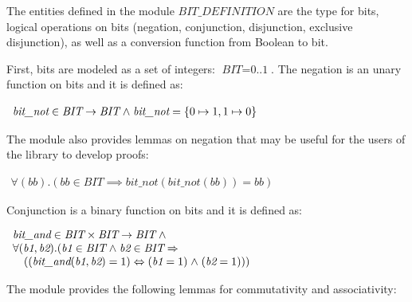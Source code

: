 \documentclass[a4paper]{llncs}
\begin{document}
The entities defined in the module $\textit{BIT\_DEFINITION}$ are the
type for bits, logical operations on bits (negation, conjunction,
disjunction, exclusive disjunction), as well as a conversion function
from Boolean to bit.

First, bits are modeled as a set of integers: $\textit{BIT} =
\textit{0..1}$. The negation is an unary function on bits and it is
defined as:



$
\begin{array}{l}
\textit{bit\_not}  \in  \textit{BIT}  \rightarrow  \textit{BIT}  \mathrel{\wedge} 
\textit{bit\_not} \rm = \rm \{ \rm 0  \mapsto  \rm 1 , \rm 1  \mapsto  \rm 0 \rm \}
\end{array}
$



The module also provides lemmas on negation that may be useful for the
users of the library to develop proofs:

$
\begin{array}{l}
\forall (\textit{bb}).(\textit{bb} \in \textit{BIT} \implies \textit{bit\_not}(\textit{bit\_not}(\textit{bb})) = \textit{bb})
\end{array}
$

Conjunction is a binary function on bits and it is defined as:

$
\begin{array}{l}
\textit{bit\_and} \in \textit{BIT} \times \textit{BIT} \fun \textit{BIT} \land \\
\forall (\textit{b1}, \textit{b2}).(\textit{b1}  \in \textit{BIT}  \land \textit{b2} \in \textit{BIT} \implies \\
\quad ((\textit{bit\_and}(\textit{b1}, \textit{b2}) = 1) \iff (\textit{b1} = 1)  \land  (\textit{b2} = 1)))
\end{array}
$

The module provides the following lemmas for commutativity and associativity:
\end{document}
